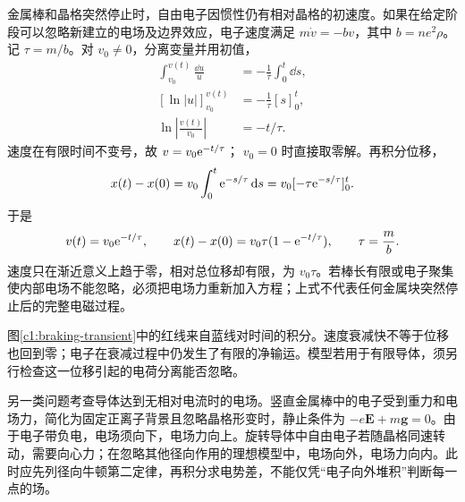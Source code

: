 金属棒和晶格突然停止时，自由电子因惯性仍有相对晶格的初速度。如果在给定阶段可以忽略新建立的电场及边界效应，电子速度满足 $m\dot v=-bv$，其中 $b=ne^2\rho$。记 $\tau=m/b$。对 $v_0\ne0$，分离变量并用初值，
\[
 \begin{aligned}
 \int_{v_0}^{v(t)}\frac{\dd u}{u}&=-\frac1\tau\int_0^t\dd s,\\
 [\ln|u|]_{v_0}^{v(t)}&=-\frac1\tau[s]_0^t,\\
 \ln\left|\frac{v(t)}{v_0}\right|&=-t/\tau.
 \end{aligned}
\]
速度在有限时间不变号，故 $v=v_0\mathrm e^{-t/\tau}$；
$v_0=0$ 时直接取零解。再积分位移，
\[
 x(t)-x(0)=v_0\int_0^t\mathrm e^{-s/\tau}\mathop{}\!\mathrm d s
 =v_0[-\tau\mathrm e^{-s/\tau}]_0^t.
\]
于是
\[
 v(t)=v_0\mathrm e^{-t/\tau},\qquad
 x(t)-x(0)=v_0\tau(1-\mathrm e^{-t/\tau}),\qquad \tau=\frac mb.
\]
速度只在渐近意义上趋于零，相对总位移却有限，为 $v_0\tau$。若棒长有限或电子聚集使内部电场不能忽略，必须把电场力重新加入方程；上式不代表任何金属块突然停止后的完整电磁过程。

图\ref{c1:braking-transient}中的红线来自蓝线对时间的积分。速度衰减快不等于位移也回到零；电子在衰减过程中仍发生了有限的净输运。模型若用于有限导体，须另行检查这一位移引起的电荷分离能否忽略。

另一类问题考查导体达到无相对电流时的电场。竖直金属棒中的电子受到重力和电场力，简化为固定正离子背景且忽略晶格形变时，静止条件为 $-e\bm E+m\bm g=0$。由于电子带负电，电场须向下，电场力向上。旋转导体中自由电子若随晶格同速转动，需要向心力；在忽略其他径向作用的理想模型中，电场向外，电场力向内。此时应先列径向牛顿第二定律，再积分求电势差，不能仅凭“电子向外堆积”判断每一点的场。



